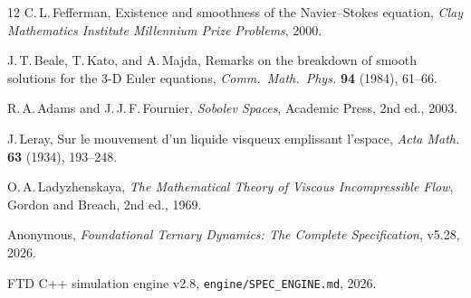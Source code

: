 \documentclass[11pt]{article}
\theoremstyle{tight}
\theoremstyle{plainroman}
\begin{document}
\begin{thebibliography}{12}
C.\,L.\,Fefferman,
Existence and smoothness of the Navier--Stokes equation,
\emph{Clay Mathematics Institute Millennium Prize Problems}, 2000.

J.\,T.\,Beale, T.\,Kato, and A.\,Majda,
Remarks on the breakdown of smooth solutions for the 3-D Euler equations,
\emph{Comm.\ Math.\ Phys.} \textbf{94} (1984), 61--66.

R.\,A.\,Adams and J.\,J.\,F.\,Fournier,
\emph{Sobolev Spaces},
Academic Press, 2nd ed., 2003.

J.\,Leray,
Sur le mouvement d'un liquide visqueux emplissant l'espace,
\emph{Acta Math.} \textbf{63} (1934), 193--248.

O.\,A.\,Ladyzhenskaya,
\emph{The Mathematical Theory of Viscous Incompressible Flow},
Gordon and Breach, 2nd ed., 1969.

Anonymous,
\emph{Foundational Ternary Dynamics: The Complete Specification}, v5.28, 2026.

FTD C++ simulation engine v2.8, \texttt{engine/SPEC\_ENGINE.md}, 2026.
\end{thebibliography}
\end{document}
